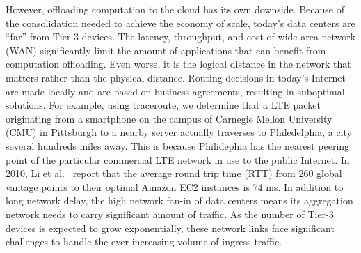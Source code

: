 However, offloading computation to the cloud has its own downside. Because of
the consolidation needed to achieve the economy of scale, today's data centers
are ``far'' from Tier-3 devices. The latency, throughput, and cost of wide-area
network (WAN) significantly limit the amount of applications that can benefit
from computation offloading. Even worse, it is the logical distance in the
network that matters rather than the physical distance. Routing decisions in
today's Internet are made locally and are based on business agreements,
resulting in suboptimal solutions. For example, using traceroute, we determine
that a LTE packet originating from a smartphone on the campus of Carnegie Mellon
University (CMU) in Pittsburgh to a nearby server actually traverses to
Philedelphia, a city several hundreds miles away. This is because Philidephia
has the nearest peering point of the particular commercial LTE network in use to
the public Internet. In 2010, Li et al.~\cite{li2010cloudcmp} report that the
average round trip time (RTT) from 260 global vantage points to their optimal
Amazon EC2 instances is 74 ms. In addition to long network delay, the high
network fan-in of data centers means its aggregation network needs to carry
significant amount of traffic. As the number of Tier-3 devices is expected to
grow exponentially, these network links face significant challenges to handle
the ever-increasing volume of ingress traffic. 

